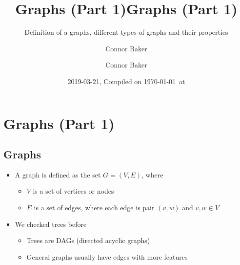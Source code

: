 \documentclass[
  10pt,
  english,
  letterpaper,
,tablecaptionabove
]{scrartcl}
\title{Graphs (Part 1)}
\subtitle{Definition of a graphs, different types of graphs and their properties}
\author{Connor Baker}
\date{2019-03-21, Compiled on \today~at \currenttime}
\title{Graphs (Part 1)}
\author{Connor Baker}
\providecommand{\tightlist}{%
  \setlength{\itemsep}{0pt}\setlength{\parskip}{0pt}}
\begin{document}

\begin{titlepage}
\afterpage{\restorepagecolor}
\newcommand{\colorRule}[3][black]{\textcolor[HTML]{#1}{\rule{#2}{#3}}}
\end{titlepage}
\restoregeometry




\hypertarget{graphs-part-1}{%
\section{Graphs (Part 1)}\label{graphs-part-1}}

\hypertarget{graphs}{%
\subsection{Graphs}\label{graphs}}

\begin{itemize}
\tightlist
\item
  A graph is defined as the set \(G = (V, E)\), where

  \begin{itemize}
  \tightlist
  \item
    \(V\) is a set of vertices or nodes
  \item
    \(E\) is a set of edges, where each edge is pair \((v,w)\) and
    \(v,w\in V\)
  \end{itemize}
\item
  We checked trees before

  \begin{itemize}
  \tightlist
  \item
    Trees are DAGs (directed acyclic graphs)
  \item
    General graphs usually have edges with more features
  \end{itemize}
\end{itemize}
\end{document}
